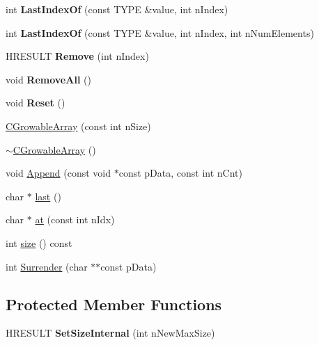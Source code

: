 \begin{DoxyCompactItemize}
\item 
\hypertarget{class_c_growable_array_a36b8cf1c09ad2672174e9943d60f7d47}{int {\bfseries Last\+Index\+Of} (const T\+Y\+P\+E \&value, int n\+Index)}\label{class_c_growable_array_a36b8cf1c09ad2672174e9943d60f7d47}

\item 
\hypertarget{class_c_growable_array_a117caee552de4bae643d0e059266a8d2}{int {\bfseries Last\+Index\+Of} (const T\+Y\+P\+E \&value, int n\+Index, int n\+Num\+Elements)}\label{class_c_growable_array_a117caee552de4bae643d0e059266a8d2}

\item 
\hypertarget{class_c_growable_array_ad8d75650829296f666f9c1f099f505a4}{H\+R\+E\+S\+U\+L\+T {\bfseries Remove} (int n\+Index)}\label{class_c_growable_array_ad8d75650829296f666f9c1f099f505a4}

\item 
\hypertarget{class_c_growable_array_a1ab980cfe0dd1733f1bce0d7a2880e2d}{void {\bfseries Remove\+All} ()}\label{class_c_growable_array_a1ab980cfe0dd1733f1bce0d7a2880e2d}

\item 
\hypertarget{class_c_growable_array_ac7c3408f14b5547243217a3dae958a2c}{void {\bfseries Reset} ()}\label{class_c_growable_array_ac7c3408f14b5547243217a3dae958a2c}

\item 
\hyperlink{class_c_growable_array_a72675e4b39fc6af1c171a8af330af692}{C\+Growable\+Array} (const int n\+Size)
\item 
\hyperlink{class_c_growable_array_a74c6b972a37b4541d31bbd78bb005061}{$\sim$\+C\+Growable\+Array} ()
\item 
void \hyperlink{class_c_growable_array_a51de1bc9b284012d8fcec35afb8cfa78}{Append} (const void $\ast$const p\+Data, const int n\+Cnt)
\item 
char $\ast$ \hyperlink{class_c_growable_array_a275b14df5aec01b2191a8762816898eb}{last} ()
\item 
char $\ast$ \hyperlink{class_c_growable_array_abe880fb37b66e56a70f6617c3c5fe3fc}{at} (const int n\+Idx)
\item 
int \hyperlink{class_c_growable_array_aeb089a62857c097309b4a838a6d3010f}{size} () const 
\item 
int \hyperlink{class_c_growable_array_a09847b768c61b295a73d19baf31f8c92}{Surrender} (char $\ast$$\ast$const p\+Data)
\end{DoxyCompactItemize}
\subsection*{Protected Member Functions}
\begin{DoxyCompactItemize}
\item 
\hypertarget{class_c_growable_array_a038c8e7e9d43bdbc27c4260ffbf00f10}{H\+R\+E\+S\+U\+L\+T {\bfseries Set\+Size\+Internal} (int n\+New\+Max\+Size)}\label{class_c_growable_array_a038c8e7e9d43bdbc27c4260ffbf00f10}

\end{DoxyCompactItemize}
